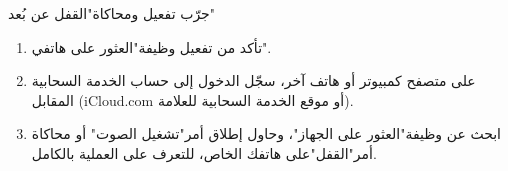 \begin{tcbpractice}{جرّب تفعيل ومحاكاة"القفل عن بُعد"}
\begin{enumerate}
  \item تأكد من تفعيل وظيفة"العثور على هاتفي".
  \item على متصفح كمبيوتر أو هاتف آخر، سجّل الدخول إلى حساب الخدمة السحابية المقابل (iCloud.com أو موقع الخدمة السحابية للعلامة).
  \item ابحث عن وظيفة"العثور على الجهاز"، وحاول إطلاق أمر"تشغيل الصوت" أو محاكاة أمر"القفل"على هاتفك الخاص، للتعرف على العملية بالكامل.
\end{enumerate}

\end{tcbpractice}
